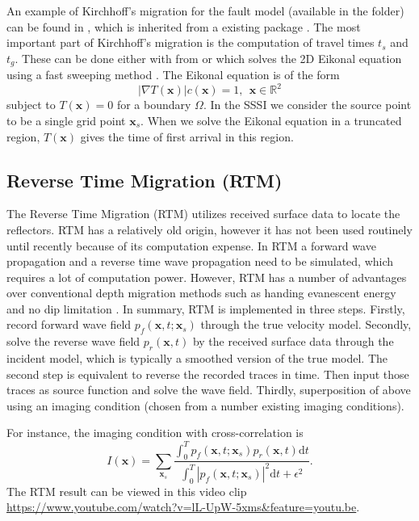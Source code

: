 \documentclass[11pt]{article}
\newcommand{\real}{\mathbb{R}}
\newcommand{\bx}{\boldsymbol{x}}
\theoremstyle{plain}
\theoremstyle{definition}
\theoremstyle{remark}
\numberwithin{equation}{section}
\begin{document}
An example of Kirchhoff's migration for the fault model (available in the  folder) can 
be found in , which is 
inherited from a existing package \cite{Koz2011}.
The most important part of Kirchhoff's migration is the computation of travel times $t_s$ and $t_g$.   
These can be done either with  from \cite{Koz2011} or
 which solves the 2D Eikonal equation using a fast sweeping method \cite{Zha2004}.
The Eikonal equation is of the form
\begin{equation}
|\nabla T(\bx)| c(\bx)= 1, ~~\bx\in \real^2
\end{equation}
subject to $T(\bx) = 0$ for a boundary $\Omega$. In the SSSI we consider the source point to be a single 
grid point $\bx_s$. When we solve the Eikonal equation in a truncated region, $T(\bx)$ gives the time of 
first arrival in this region. 

\subsection{Reverse Time Migration (RTM)}
The Reverse Time Migration (RTM) utilizes received surface data to locate the reflectors. 
RTM has a relatively old origin, however it has not been used routinely until recently because of its
computation expense. In RTM a forward wave propagation and a reverse time wave propagation need to be 
simulated, which requires a lot of computation power. However, RTM has a number of advantages over conventional depth migration methods such as 
handing evanescent energy and no dip limitation \cite{Mcm1983, BayKosAO1983}. In summary, RTM is implemented in three steps. Firstly, 
record forward wave field $p_f(\bx, t; \bx_s)$ through the true velocity model. Secondly, solve the reverse wave field $p_r(\bx, t)$ by the received surface data through the incident model, which is typically a smoothed version of the true model. The second step is equivalent to reverse the recorded traces in time. Then input those traces as source function and solve the wave field. Thirdly, superposition of above using an imaging condition (chosen from a number existing imaging conditions).

For instance, the imaging condition with cross-correlation is 
\begin{equation}
I(\bx) = \sum_{\bx_s} \frac{\int_0^T p_f(\bx, t; \bx_s)p_r(\bx, t)\mathrm{d}t}{\int_0^T |p_f(\bx, t; \bx_s)|^2\mathrm{d}t + \epsilon^2}.
\end{equation}
The RTM result can be viewed in this video clip
\url{https://www.youtube.com/watch?v=lL-UpW-5xms&feature=youtu.be}.
\end{document}
